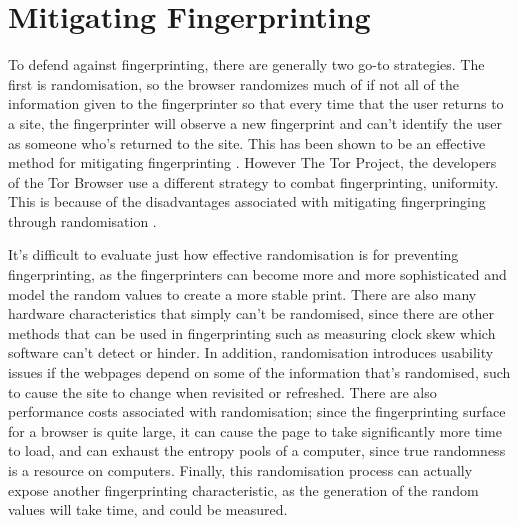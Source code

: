 \chapter{Mitigating Fingerprinting}

To defend against fingerprinting, there are generally two go-to strategies.
The first is randomisation, so the browser randomizes much of if not all of the information given to the fingerprinter so that every time that the user returns to a site, the fingerprinter will observe a new fingerprint and can't identify the user as someone who's returned to the site.
This has been shown to be an effective method for mitigating fingerprinting \citep{privaricator}.
However The Tor Project, the developers of the Tor Browser use a different strategy to combat fingerprinting, uniformity.
This is because of the disadvantages associated with mitigating fingerpringing through randomisation \citep{tor-project}.

It's difficult to evaluate just how effective randomisation is for preventing fingerprinting, as the fingerprinters can become more and more sophisticated and model the random values to create a more stable print.
There are also many hardware characteristics that simply can't be randomised, since there are other methods that can be used in fingerprinting such as measuring clock skew which software can't detect or hinder.
In addition, randomisation introduces usability issues if the webpages depend on some of the information that's randomised, such to cause the site to change when revisited or refreshed.
There are also performance costs associated with randomisation; since the fingerprinting surface for a browser is quite large, it can cause the page to take significantly more time to load, and can exhaust the entropy pools of a computer, since true randomness is a resource on computers.
Finally, this randomisation process can actually expose another fingerprinting characteristic, as the generation of the random values will take time, and could be measured.



